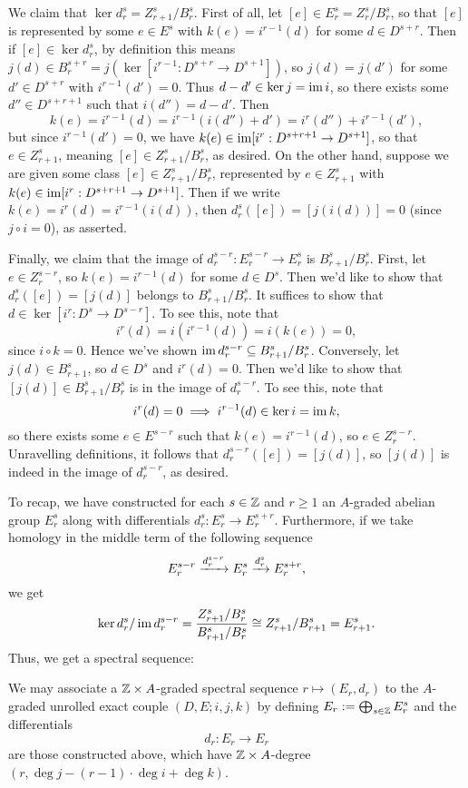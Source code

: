 \documentclass[../main.tex]{subfiles}
\begin{document}
We claim that $\ker d_r^s=Z^s_{r+1}/B^s_r$. First of all, let $[e]\in E_r^s=Z_r^s/B_r^s$, so that $[e]$ is represented by some $e\in E^s$ with $k(e)=i^{r-1}(d)$ for some $d\in D^{s+r}$. Then if $[e]\in\ker d_r^s$, by definition this means $j(d)\in B_r^{s+r}=j(\ker[i^{r-1}:D^{s+r}\to D^{s+1}])$, so $j(d)=j(d')$ for some $d'\in D^{s+r}$ with $i^{r-1}(d')=0$. Thus $d-d'\in\ker j=\operatorname{im} i$, so there exists some $d''\in D^{s+r+1}$ such that $i(d'')=d-d'$. Then
\[k(e)=i^{r-1}(d)=i^{r-1}(i(d'')+d')=i^r(d'')+i^{r-1}(d'),\]
but since $i^{r-1}(d')=0$, we have $k(e)\in\operatorname{im}[i^r:D^{s+r+1}\to D^{s+1}]$, so that $e\in Z^s_{r+1}$, meaning $[e]\in Z^s_{r+1}/B^s_r$, as desired. On the other hand, suppose we are given some class $[e]\in Z^s_{r+1}/B^s_r$, represented by $e\in Z^s_{r+1}$ with $k(e)\in\operatorname{im}[i^r:D^{s+r+1}\to D^{s+1}]$. Then if we write $k(e)=i^r(d)=i^{r-1}(i(d))$, then $d_r^s([e])=[j(i(d))]=0$ (since $j\circ i=0$), as asserted.

Finally, we claim that the image of $d_r^{s-r}:E^{s-r}_r\to E^s_r$ is $B^s_{r+1}/B^s_r$. First, let $e\in Z^{s-r}_r$, so $k(e)=i^{r-1}(d)$ for some $d\in D^{s}$. Then we'd like to show that $d_r^s([e])=[j(d)]$ belongs to $B^s_{r+1}/B^s_r$. It suffices to show that $d\in \ker[i^r:D^s\to D^{s-r}]$. To see this, note that 
\[i^r(d)=i(i^{r-1}(d))=i(k(e))=0,\]
since $i\circ k=0$. Hence we've shown $\operatorname{im} d_r^{s-r}\subseteq B^s_{r+1}/B^s_r$. Conversely, let $j(d)\in B^s_{r+1}$, so $d\in D^s$ and $i^{r}(d)=0$. Then we'd like to show that $[j(d)]\in B^s_{r+1}/B^s_r$ is in the image of $d_r^{s-r}$. To see this, note that
\[i^r(d)=0\implies i^{r-1}(d)\in\ker i=\operatorname{im} k,\]
so there exists some $e\in E^{s-r}$ such that $k(e)=i^{r-1}(d)$, so $e\in Z^{s-r}_r$. Unravelling definitions, it follows that $d_r^{s-r}([e])=[j(d)]$, so $[j(d)]$ is indeed in the image of $d_r^{s-r}$, as desired.

To recap, we have constructed for each $s\in\mathbb{Z}$ and $r\geq1$ an $A$-graded abelian group $E_r^s$ along with differentials $d_r^s:E_r^s\to E_r^{s+r}$. Furthermore, if we take homology in the middle term of the following sequence
\[E_r^{s-r}\xrightarrow{d_r^{s-r}}E_r^s\xrightarrow{d_r^s}E^{s+r}_r,\]
we get
\[\ker d_r^s/\operatorname{im} d_r^{s-r}=\frac{Z_{r+1}^s/B_r^s}{B_{r+1}^s/B_r^s}\cong Z_{r+1}^s/B_{r+1}^s=E_{r+1}^s.\]
Thus, we get a spectral sequence:

\begin{proposition}\label{SSeq_assoc_to_unrolled_EC}
    We may associate a $\mathbb{Z}\times A$-graded spectral sequence $r\mapsto(E_r,d_r)$ to the $A$-graded unrolled exact couple $(D,E;i,j,k)$ by defining $E_r:=\bigoplus_{s\in\mathbb{Z}}E_r^s$ and the differentials 
    \[d_r:E_r\to E_r\]
    are those constructed above, which have $\mathbb{Z}\times A$-degree $(r,\deg j-(r-1)\cdot\deg i+\deg k)$.
\end{proposition}
\end{document}
